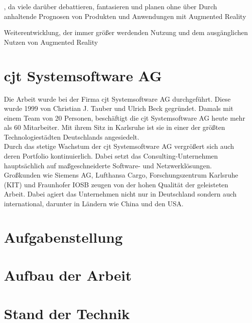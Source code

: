 , da viele darüber debattieren, fantasieren und 
planen ohne über
Durch anhaltende Prognosen von Produkten und Anwendungen mit Augmented Reality 

Weiterentwicklung, der immer größer werdenden Nutzung und dem ausgänglichen Nutzen von Augmented Reality 


\section{cjt Systemsoftware AG}
Die Arbeit wurde bei der Firma cjt Systemsoftware AG durchgeführt. Diese wurde
1999 von Christian J. Tauber und Ulrich Beck gegründet. Damals mit einem Team
von 20 Personen, beschäftigt die cjt Systemsoftware AG heute mehr als 60 Mitarbeiter. 
Mit ihrem Sitz in Karlsruhe ist sie in einer der größten Technologiestädten Deutschlands angesiedelt.
\\
\linebreak
Durch das stetige Wachstum der cjt Systemsoftware AG vergrößert sich auch deren
Portfolio kontinuierlich. Dabei setzt das Consulting-Unternehmen hauptsächlich auf maßgeschneiderte
Software- und Netzwerklösungen. Großkunden wie Siemens AG, Lufthansa Cargo,
Forschungszentrum Karlsruhe (KIT) und Fraunhofer IOSB zeugen von der hohen Qualität der geleisteten Arbeit. 
Dabei agiert das Unternehmen nicht nur in Deutschland sondern auch international, darunter in Ländern wie China und den USA.

\section{Aufgabenstellung}
\section{Aufbau der Arbeit}
\section{Stand der Technik}